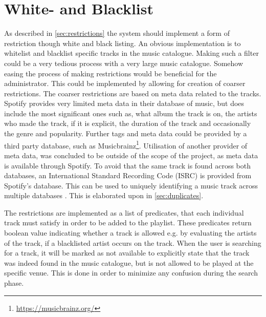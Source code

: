 \section{White- and Blacklist}
As described in \cref{sec:restrictions} the system should implement a
form of restriction though white and black listing. An obvious
implementation is to whitelist and blacklist specific tracks in the
music catalogue. Making such a filter could be a very tedious process
with a very large music catalogue. Somehow easing the process of
making restrictions would be beneficial for the administrator. This
could be implemented by allowing for creation of coarser
restrictions. The coarser restrictions are based on meta data related
to the tracks.
Spotify provides very limited meta data in their database of music,
but does include the most significant ones such as, what album the
track is on, the artists who made the track, if it is explicit, the
duration of the track and occasionally the genre and
popularity. Further tags and meta data could be provided by a third
party database, such as
Musicbrainz\footnote{\url{https://musicbrainz.org/}}. Utilisation of
another provider of meta data, was concluded to be outside of the
scope of the project, as meta data is available through Spotify. To
avoid that the same track is found across both databases, an
International Standard Recording Code (ISRC) is provided from
Spotify’s database. This can be used to uniquely identifying a music
track across multiple databases \cite{isrc}. This is elaborated upon
in \cref{sec:duplicates}.

The restrictions are implemented as a list of predicates, that each individual track must satisfy in order to be added to the playlist. These predicates return boolean value indicating whether a track is allowed e.g. by evaluating the artists of the track, if a blacklisted artist occurs on the track. When the user is searching for a track, it will be marked as not available to explicitly state that the track was indeed found in the music catalogue, but is not allowed to be played at the specific venue. This is done in order to minimize any confusion during the search phase.
